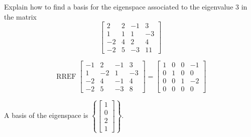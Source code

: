 
\begin{exerciseStatement}


Explain how to find a basis for the eigenspace associated to the eigenvalue \( 3 \) in the matrix \[ \left[\begin{array}{cccc}
2 & 2 & -1 & 3 \\
1 & 1 & 1 & -3 \\
-2 & 4 & 2 & 4 \\
-2 & 5 & -3 & 11
\end{array}\right] \]


\end{exerciseStatement}
    
\begin{exerciseAnswer} 


\[\operatorname{RREF} \left[\begin{array}{cccc}
-1 & 2 & -1 & 3 \\
1 & -2 & 1 & -3 \\
-2 & 4 & -1 & 4 \\
-2 & 5 & -3 & 8
\end{array}\right] = \left[\begin{array}{cccc}
1 & 0 & 0 & -1 \\
0 & 1 & 0 & 0 \\
0 & 0 & 1 & -2 \\
0 & 0 & 0 & 0
\end{array}\right] \]



A basis of the eigenspace is \( \left\{ \left[\begin{array}{c}
1 \\
0 \\
2 \\
1
\end{array}\right] \right\} \).


\end{exerciseAnswer}
    

